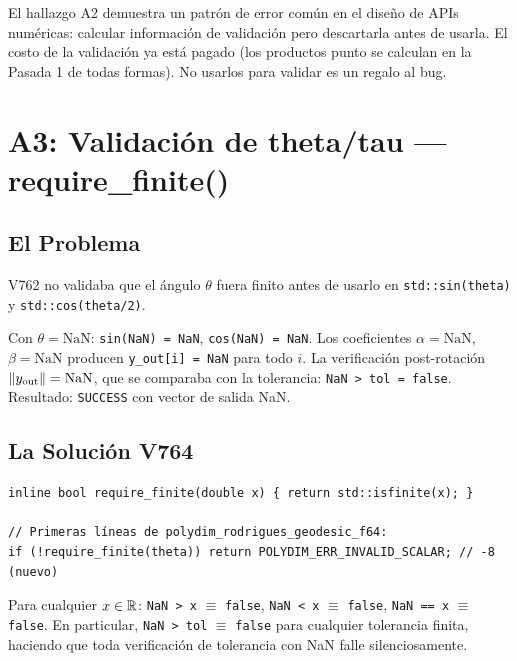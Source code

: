 \begin{remark}
El hallazgo A2 demuestra un patrón de error común en el diseño de APIs numéricas:
calcular información de validación pero descartarla antes de usarla. El costo de
la validación ya está pagado (los productos punto se calculan en la Pasada 1 de
todas formas). No usarlos para validar es un regalo al bug.
\end{remark}

\section{A3: Validación de theta/tau --- require\_finite()}

\subsection{El Problema}

V762 no validaba que el ángulo $\theta$ fuera finito antes de usarlo en
\texttt{std::sin(theta)} y \texttt{std::cos(theta/2)}.

Con $\theta = \text{NaN}$: \texttt{sin(NaN) = NaN}, \texttt{cos(NaN) = NaN}.
Los coeficientes $\alpha = \text{NaN}$, $\beta = \text{NaN}$ producen
\texttt{y\_out[i] = NaN} para todo $i$. La verificación post-rotación
$\norm{y_{\text{out}}} = \text{NaN}$, que se comparaba con la tolerancia:
\texttt{NaN > tol = false}. Resultado: \texttt{SUCCESS} con vector de salida NaN.

\subsection{La Solución V764}

\begin{lstlisting}[style=cppstyle, caption={Validación de theta --- A3}, label=lst:theta_validation]
inline bool require_finite(double x) { return std::isfinite(x); }

// Primeras líneas de polydim_rodrigues_geodesic_f64:
if (!require_finite(theta)) return POLYDIM_ERR_INVALID_SCALAR; // -8 (nuevo)
\end{lstlisting}

\begin{proposition}
Para cualquier $x \in \mathbb{R}$: \texttt{NaN > x} $\equiv$ \texttt{false},
\texttt{NaN < x} $\equiv$ \texttt{false}, \texttt{NaN == x} $\equiv$ \texttt{false}.
En particular, \texttt{NaN > tol} $\equiv$ \texttt{false} para cualquier tolerancia finita,
haciendo que toda verificación de tolerancia con NaN falle silenciosamente.
\end{proposition}

